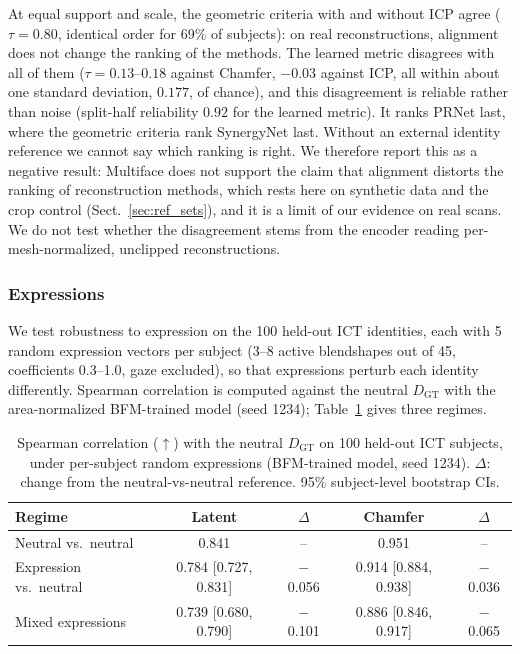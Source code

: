At equal support and scale, the geometric criteria with and without ICP agree ($\tau=0.80$, identical order for 69\% of subjects): on real reconstructions, alignment does not change the ranking of the methods. The learned metric disagrees with all of them ($\tau=0.13$--$0.18$ against Chamfer, $-0.03$ against ICP, all within about one standard deviation, $0.177$, of chance), and this disagreement is reliable rather than noise (split-half reliability $0.92$ for the learned metric). It ranks PRNet last, where the geometric criteria rank SynergyNet last. Without an external identity reference we cannot say which ranking is right. We therefore report this as a negative result: Multiface does not support the claim that alignment distorts the ranking of reconstruction methods, which rests here on synthetic data and the crop control (Sect.~\ref{sec:ref_sets}), and it is a limit of our evidence on real scans. We do not test whether the disagreement stems from the encoder reading per-mesh-normalized, unclipped reconstructions. 

\subsubsection{Expressions}
\label{sec:expressions}
We test robustness to expression on the 100 held-out ICT identities, each with 5 random expression vectors per subject (3--8 active blendshapes out of 45, coefficients 0.3--1.0, gaze excluded), so that expressions perturb each identity differently. Spearman correlation is computed against the neutral $D_{\mathrm{GT}}$ with the area-normalized BFM-trained model (seed 1234); Table~\ref{tab:expressions} gives three regimes.

\begin{table}[!ht]
\centering
\small
\caption{Spearman correlation ($\uparrow$) with the neutral $D_{\mathrm{GT}}$ on 100 held-out ICT subjects, under per-subject random expressions (BFM-trained model, seed 1234). $\Delta$: change from the neutral-vs-neutral reference. 95\% subject-level bootstrap CIs.}
\label{tab:expressions}
\setlength{\tabcolsep}{4pt}
\begin{tabular}{lcccc}
\toprule
Regime & Latent & $\Delta$ & Chamfer & $\Delta$ \\
\midrule
Neutral vs.\ neutral & 0.841 & -- & 0.951 & -- \\
Expression vs.\ neutral & 0.784 [0.727, 0.831] & $-$0.056 & 0.914 [0.884, 0.938] & $-$0.036 \\
Mixed expressions & 0.739 [0.680, 0.790] & $-$0.101 & 0.886 [0.846, 0.917] & $-$0.065 \\
\bottomrule
\end{tabular}
\end{table}

